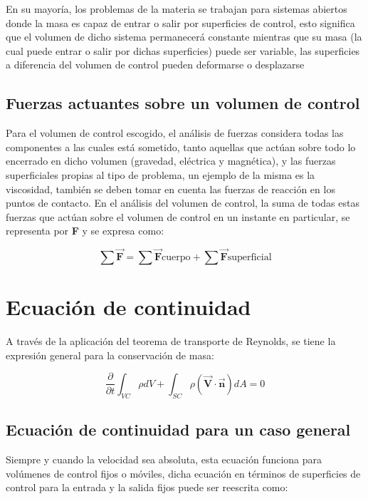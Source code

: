 \documentclass[10pt, oneside]{article}
\begin{document}
En su mayoría, los problemas de la materia se trabajan para sistemas abiertos donde la masa es capaz de entrar o salir por superficies de control, esto significa que el volumen de dicho sistema permanecerá constante mientras que su masa (la cual puede entrar o salir por dichas superficies) puede ser variable, las superficies a diferencia del volumen de control pueden deformarse o desplazarse 


\subsection{Fuerzas actuantes sobre un volumen de control}

Para el volumen de control escogido, el análisis de fuerzas considera todas las componentes a las cuales está sometido, tanto aquellas que actúan sobre todo lo encerrado en dicho volumen (gravedad, eléctrica y magnética), y las fuerzas superficiales propias al tipo de problema, un ejemplo de la misma es la viscosidad, también se deben tomar en cuenta las fuerzas de reacción en los puntos de contacto. En el análisis del volumen de control, la suma de todas estas fuerzas que actúan sobre el volumen de control en un instante en particular, se representa por \textbf{F} y se expresa como: 

\begin{equation}
\sum \vec{\mathbf{F}} = \sum \vec{\mathbf{F}}{\text{cuerpo}} + \sum \vec{\mathbf{F}}{\text{superficial}}
\end{equation}

%

\section{Ecuación de continuidad}
A través de la aplicación del teorema de transporte de Reynolds, se tiene la expresión general para la conservación de masa:

\begin{equation}
\frac{\partial}{\partial t} \int_{VC} \rho  dV + \int_{SC} \rho (\mathbf{\vec{V}} \cdot \mathbf{\vec{n}}) dA = 0
\end{equation}

\subsection{Ecuación de continuidad para un caso general}
Siempre y cuando la velocidad sea absoluta, esta ecuación funciona para volúmenes de control fijos o móviles, dicha ecuación en términos de superficies de control para la entrada y la salida fijos puede ser reescrita como: 
\end{document}
